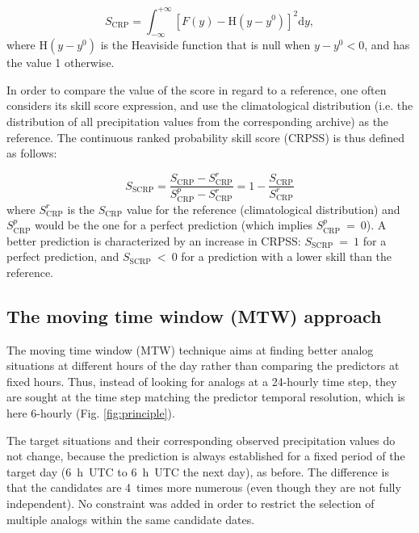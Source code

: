 \documentclass[hess, manuscript]{copernicus}
\begin{document}
\begin{equation}
\label{eq:CRPS}
S_{\text{CRP}} = \int_{-\infty}^{+\infty} \left[ F(y)-\text{H}(y-y^{0})\right]^{2} \text{d}y ,  
\end{equation}
where $\text{H}(y-y^{0})$ is the Heaviside function that is null when $y-y^{0}<0$, and has the value 1 otherwise.

In order to compare the value of the score in regard to a reference, one often considers its skill score expression, and use the climatological distribution (i.e. the distribution of all precipitation values from the corresponding archive) as the reference. The continuous ranked probability skill score (CRPSS) is thus defined as follows:

\begin{equation}
\label{eq:CRPSS}
S_{\text{SCRP}} = \frac{S_{\text{CRP}}-S_{\text{CRP}}^{r}}{S_{\text{CRP}}^{p}-S_{\text{CRP}}^{r}} = 1-\frac{S_{\text{CRP}}}{S_{\text{CRP}}^{r}}
\end{equation}
where $S_{\text{CRP}}^{r}$ is the $S_{\text{CRP}}$ value for the reference (climatological distribution) and $S_{\text{CRP}}^{p}$ would be the one for a perfect prediction (which implies $S_{\text{CRP}}^{p}~=~0$). A better prediction is characterized by an increase in CRPSS: $S_{\text{SCRP}}~=~1$ for a perfect prediction, and $S_{\text{SCRP}}~<~0$ for a prediction with a lower skill than the reference.


\subsection{The moving time window (MTW) approach}
\label{sec:mtw}

The moving time window (MTW) technique aims at finding better analog situations at different hours of the day rather than comparing the predictors at fixed hours. Thus, instead of looking for analogs at a 24-hourly time step, they are sought at the time step matching the predictor temporal resolution, which is here 6-hourly (Fig. \ref{fig:principle}).

The target situations and their corresponding observed precipitation values do not change, because the prediction is always established for a fixed period of the target day (6~h~UTC to 6~h~UTC the next day), as before. The difference is that the candidates are 4~times more numerous (even though they are not fully independent). No constraint was added in order to restrict the selection of multiple analogs within the same candidate dates.
\end{document}
